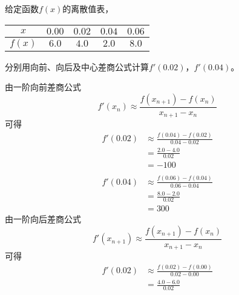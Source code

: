 \documentclass[11pt]{article}
\begin{document}
\maketitle

\thispagestyle{empty}

\newpage

\begin{question}

    \questiontext
    {
        给定函数$f(x)$的离散值表，
        \begin{table}[h]
            \centering
            \begin{tabular}{|c|c|c|c|c|}
                \hline
                $x$    & $0.00$ & $0.02$ & $0.04$ & $0.06$ \\ \hline
                $f(x)$ & $6.0$  & $4.0$  & $2.0$  & $8.0$  \\ \hline
            \end{tabular}
        \end{table}
        分别用向前、向后及中心差商公式计算$f'(0.02)$，$f'(0.04)$。
    }
    \answer
    {
        由一阶向前差商公式
        \begin{equation*}
            f'(x_{n}) \approx \frac{f(x_{n + 1}) - f(x_{n})}{x_{n + 1} - x_{n}}
        \end{equation*}
        可得
        \begin{align*}
            f'(0.02) & \approx \frac{f(0.04) - f(0.02)}{0.04 - 0.02} \\
                     & = \frac{2.0 - 4.0}{0.02}                      \\
                     & = -100                                        \\
            \\
            f'(0.04) & \approx \frac{f(0.06) - f(0.04)}{0.06 - 0.04} \\
                     & = \frac{8.0 - 2.0}{0.02}                      \\
                     & = 300
        \end{align*}
        由一阶向后差商公式
        \begin{equation*}
            f'(x_{n + 1}) \approx \frac{f(x_{n + 1}) - f(x_{n})}{x_{n + 1} - x_{n}}
        \end{equation*}
        可得
        \begin{align*}
            f'(0.02) & \approx \frac{f(0.02) - f(0.00)}{0.02 - 0.00} \\
                     & = \frac{4.0 - 6.0}{0.02}                      \\

\end{align*}}
\end{question}
\end{document}
